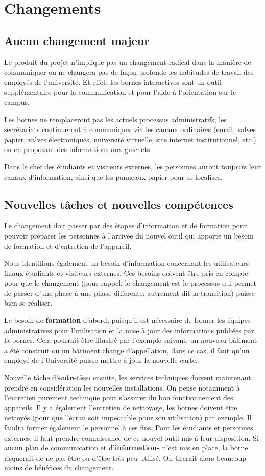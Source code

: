 \chapter{Changements}
\section{Aucun changement majeur}
Le produit du projet n'implique pas un changement radical dans la manière de communiquer ou ne changera pas de façon profonde les habitudes de travail des employés de l'université. Et effet, les bornes interactives sont un outil supplémentaire pour la communication et pour l'aide à l'orientation sur le campus.

Les bornes ne remplaceront pas les actuels processus administratifs; les secrétariats continueront à communiquer via les canaux ordinaires (email, valves papier, valves électroniques, université virtuelle, site internet institutionnel, etc.) ou en proposant des informations aux guichets.

Dans le chef des étudiants et visiteurs externes, les personnes auront toujours leur canaux d'information, ainsi que les panneaux papier pour se localiser.

\section{Nouvelles tâches et nouvelles compétences}
Le changement doit passer par des étapes d'information et de formation pour pouvoir préparer les personnes à l'arrivée du nouvel outil qui apporte un besoin de formation et d'entretien de l'appareil.

Nous identifions également un besoin d'information concernant les utilisateurs finaux étudiants et visiteurs externes. Ces besoins doivent être pris en compte pour que le changement (pour rappel, le changement est le processus qui permet de passer d'une phase à une phase différente; autrement dit la transition) puisse bien se réaliser. 

Le besoin de \textbf{formation} d'abord, puisqu'il est nécessaire de former les équipes administratives pour l'utilisation et la mise à jour des informations publiées par la bornes. 
Cela pourrait être illustré par l'exemple suivant: un nouveau bâtiment a été construit ou un bâtiment change d'appellation, dans ce cas, il faut qu'un employé de l'Université puisse mettre à jour la nouvelle carte. 

Nouvelle tâche d'\textbf{entretien} ensuite, les services techniques doivent maintenant prendre en considération les nouvelles installations. On pense notamment à l'entretien purement technique pour s'assurer du bon fonctionnement des appareils. Il y a également l'entretien de nettoyage, les bornes doivent être nettoyés (pour que l'écran soit impeccable pour son utilisation) par exemple. Il faudra former également le personnel à ces fins.  
Pour les étudiants et personnes externes, il faut prendre connaissance de ce nouvel outil mis à leur disposition. Si aucun plan de communication et d'\textbf{informations}  n'est mis en place, la borne risquerait de ne pas être ou d'être très peu utilisé. On tirerait alors beaucoup moins de bénéfices du changement. 


